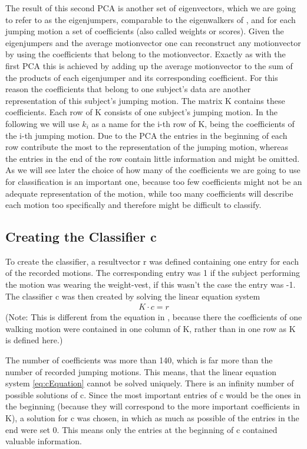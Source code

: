 \documentclass[a4paper]{article}
\begin{document}
The result of this second PCA is another set of eigenvectors, which we are going to refer to as the eigenjumpers, comparable to the eigenwalkers of \cite{origin}, and for each jumping motion a set of coefficients (also called weights or scores).
Given the eigenjumpers and the average motionvector one can reconstruct any motionvector by using the coefficients that belong to the motionvector. Exactly as with the first PCA this is achieved by adding up the average motionvector to the sum of the products of each eigenjumper and its corresponding coefficient.
For this reason the coefficients that belong to one subject's data are another representation of this subject's jumping motion.
The matrix K contains these coefficients. Each row of K consists of one subject's jumping motion. In the following we will use $k_{i}$ as a name for the i-th row of K, being the coefficients of the i-th jumping motion.
Due to the PCA the entries in the beginning of each row contribute the most to the representation of the jumping motion, whereas the entries in the end of the row contain little information and might be omitted.
As we will see later the choice of how many of the coefficients we are going to use for classification is an important one, because too few coefficients might not be an adequate representation of the motion, while too many coefficients will describe each motion too specifically and therefore might be difficult to classify.

\subsection{Creating the Classifier c}

To create the classifier, a resultvector r was defined containing one entry for each of the recorded motions. The corresponding entry was 1 if the subject performing the motion was wearing the weight-vest, if this wasn't the case the entry was -1. The classifier c was then created by solving the linear equation system
\begin{align}
	K \cdot c=r \label{eq:cEquation}
\end{align} 
(Note: This is different from the equation in \cite{origin}, because there the coefficients of one walking motion were contained in one column of K, rather than in one row as K is defined here.)

The number of coefficients was more than 140, which is far more than the number of recorded jumping motions. This means, that the linear equation system \ref{eq:cEquation} cannot be solved uniquely. There is an infinity number of possible solutions of c. Since the most important entries of c would be the ones in the beginning (because they will correspond to the more important coefficients in K), a solution for c was chosen, in which as much as possible of the entries in the end were set 0. This means only the entries at the beginning of c contained valuable information.
\end{document}
